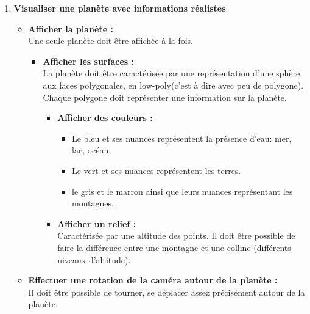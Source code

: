 \documentclass[a4paper]{article}
\begin{document}
\begin{enumerate}
\begin{itemize}
        
        
    \end{itemize}
    
    
    \item \textbf{Visualiser une planète avec informations réalistes}
    
    \begin{itemize}
        \item \textbf{Afficher la planète :} \\
        Une seule planète doit être affichée à la fois.
         \begin{itemize}
         \item \textbf{Afficher les surfaces :} \\
         La planète doit être caractérisée par une représentation d'une sphère aux faces polygonales, en low-poly(c'est à dire avec peu de polygone). \\
         Chaque polygone doit représenter une information sur la planète. 
         
         \begin{itemize}
          \item \textbf{Afficher des couleurs :}
            \begin{itemize}
                \item Le bleu et ses nuances représentent la présence d'eau: mer, lac, océan.
                \item Le vert et ses nuances représentent les terres.
                \item le gris et le marron ainsi que leurs nuances représentant les montagnes.
            \end{itemize}
            
          \item \textbf{Afficher un relief :} \\
            Caractérisée par une altitude des points. Il doit être possible de faire la différence entre une montagne et une colline (différents niveaux d'altitude).
        \end{itemize}
        
        \end{itemize}
    
        \item \textbf{Effectuer une rotation de la caméra autour de la planète :} \\
        Il doit être possible de tourner, se déplacer assez précisément autour de la planète.
        

\end{itemize}
\end{enumerate}
\end{document}
